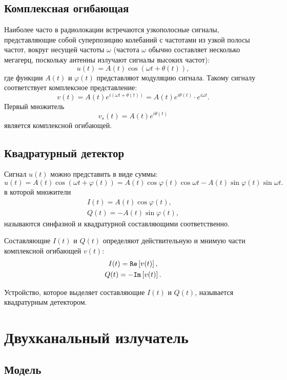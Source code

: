\subsection{Комплексная огибающая}

Наиболее часто в радиолокации встречаются узкополосные сигналы, представляющие собой суперпозицию колебаний с частотами из узкой полосы частот, вокруг несущей
частоты $\omega$ (частота $\omega$ обычно составляет несколько мегагерц, поскольку антенны излучают сигналы высоких частот):
\[
    u(t) = A(t) \cos ( \omega t + \theta(t) ),
\]
где функции $A(t)$ и $\varphi(t)$ представляют модуляцию сигнала. Такому сигналу соответствует комплексное представление:
\[
    v(t)
    = A(t) e^{i ( \omega t + \theta(t) )}
    = A(t) e^{i \theta(t)} \cdot e^{i \omega t} .
\]
Первый множитель
\[
    v_s(t) = A(t) e^{i \theta(t)}
\]
является комплексной огибающей.

\subsection{Квадратурный детектор}

Сигнал $u(t)$ можно представить в виде суммы:
\[
    u(t)
    = A(t) \cos ( \omega t + \varphi(t) )
    = A(t) \cos \varphi(t) \cos \omega t - A(t) \sin \varphi(t) \sin \omega t .
\]
в которой множители
\begin{gather*}
    I(t) = A(t) \cos \varphi(t) , \\
    Q(t) = - A(t) \sin \varphi(t) ,
\end{gather*}
называются синфазной и квадратурной составляющими соответственно.

Составляющие $I(t)$ и $Q(t)$ определяют действительную и мнимую части комплексной огибающей $v(t)$:
\begin{gather*}
    I(t) = \mathtt{Re} \left [ v(t) \right ] , \\
    Q(t) = - \mathtt{Im} \left [ v(t) \right ] .
\end{gather*}

Устройство, которое выделяет составляющие $I(t)$ и $Q(t)$, называется квадратурным детектором.


\section{Двухканальный излучатель}

\subsection{Модель}

